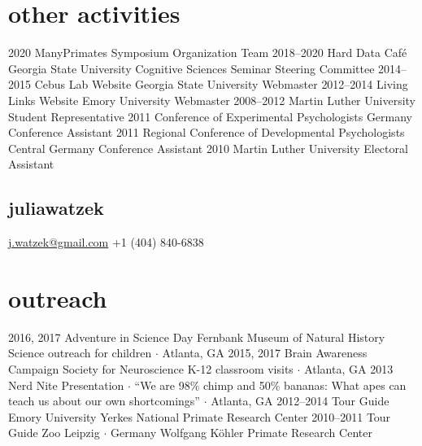 \documentclass[]{friggeri-cv}
\begin{document}
\section{other activities}

\begin{entrylist}
  \entry
    {2020}
    {ManyPrimates Symposium}
    {}
    {Organization Team}
  \entry
    {2018--2020}
    {Hard Data Café}
    {Georgia State University}
    {Cognitive Sciences Seminar Steering Committee}
  \entry
    {2014--2015}
    {Cebus Lab Website}
    {Georgia State University}
    {Webmaster}
  \entry
    {2012--2014}
    {Living Links Website}
    {Emory University}
    {Webmaster}
  \entry
    {2008--2012}
    {Martin Luther University}
    {}
    {Student Representative}
 \entry
   {2011}
   {Conference of Experimental Psychologists}
   {Germany}
   {Conference Assistant}
 \entry
   {2011}
   {Regional Conference of Developmental Psychologists}
   {Central Germany}
   {Conference Assistant}
 \entry
   {2010}
   {Martin Luther University}
   {}
   {Electoral Assistant}
\end{entrylist}



\newpage

\begin{aside}
  \section{{\normalfont julia}watzek}
    \href{mailto:j.watzek@gmail.com}{j.watzek@gmail.com}
    +1 (404) 840-6838
\end{aside}


\section{outreach}

\begin{entrylist}
  \entry
    {2016, 2017}
    {Adventure in Science Day}
    {Fernbank Museum of Natural History}
    {Science outreach for children $\cdot$ Atlanta, GA}
  \entry
    {2015, 2017}
    {Brain Awareness Campaign}
    {Society for Neuroscience}
    {K-12 classroom visits $\cdot$ Atlanta, GA}
  \entry
    {2013}
    {Nerd Nite}
    {}
    {Presentation $\cdot$ ``We are 98\% chimp and 50\% bananas: What apes can teach us about our own shortcomings'' $\cdot$ Atlanta, GA}
  \entry
    {2012--2014}
    {Tour Guide}
    {Emory University}
    {Yerkes National Primate Research Center}
  \entry
    {2010--2011}
    {Tour Guide}
    {Zoo Leipzig $\cdot$ Germany}
    {Wolfgang K\"{o}hler Primate Research Center}
\end{entrylist}
\end{document}
